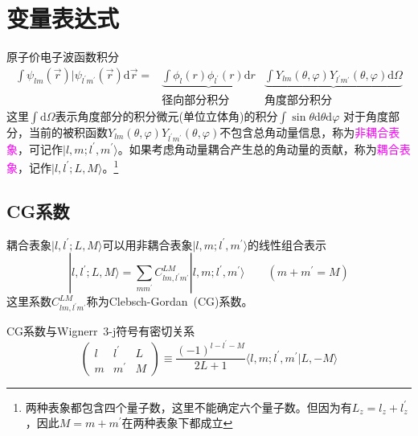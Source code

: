 \section{变量表达式}
原子价电子波函数积分
\begin{equation}
	\begin{aligned}
		\int\psi_{lm}(\vec r)|\psi_{l^{\prime}m^{\prime}}(\vec r)\mathrm{d}\vec r=&\underbrace{\int\phi_l(r)\phi_{l^{\prime}}(r)\mathrm{d}r}&\underbrace{\int Y_{lm}(\theta,\varphi)Y_{l^{\prime}m^{\prime}}(\theta,\varphi)\mathrm{d}\Omega} \\%
		&\mbox{径向部分积分} &\mbox{角度部分积分}
	\end{aligned}
	\label{eq:wave-integral}
\end{equation}
这里$\int\mathrm{d}\Omega$表示角度部分的积分微元(单位立体角)的积分$\int\sin\theta\mathrm{d}\theta\mathrm{d}\varphi$
对于角度部分，当前的被积函数$Y_{lm}(\theta,\varphi)Y_{l^{\prime}m^{\prime}}(\theta,\varphi)$不包含总角动量信息，称为\textcolor{magenta}{非耦合表象}，可记作$|l,m;l^{\prime},m^{\prime}\rangle$。如果考虑角动量耦合产生总的角动量的贡献，称为\textcolor{magenta}{耦合表象}，记作$|l,l^{\prime};L,M\rangle$。\footnote{两种表象都包含四个量子数，这里不能确定六个量子数。但因为有$L_z=l_z+l_z^{\prime}$，因此$M=m+m^{\prime}$在两种表象下都成立}

\subsection{\rm{CG}系数}
耦合表象$|l,l^{\prime};L,M\rangle$可以用非耦合表象$|l,m;l^{\prime},m^{\prime}\rangle$的线性组合表示
\begin{equation}
	|l,l^{\prime};L,M\rangle=\sum_{mm^{\prime}}C_{lm,l^{\prime}m^{\prime}}^{LM}|l,m;l^{\prime},m^{\prime}\rangle \qquad(m+m^{\prime}=M)
	\label{eq:couple_vs_uncouple}
\end{equation}
这里系数$C_{lm,l^{\prime}m^{\prime}}^{LM}$称为\textrm{Clebsch-Gordan~(CG)}系数。

\textrm{CG}系数与\textrm{Wignerr~3-j}符号有密切关系
\begin{equation}
	\begin{pmatrix}l &l^{\prime} &L\\m &m^{\prime} &M\end{pmatrix}\equiv\dfrac{(-1)^{l-l^{\prime}-M}}{2L+1}\langle l,m;l^{\prime},m^{\prime}|L,-M\rangle
	\label{eq:CG-vs-Wigner_3-j}
\end{equation}

